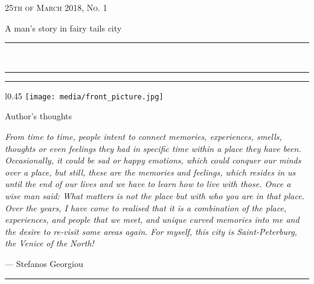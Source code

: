 \documentclass[10pt,a4paper]{article} %
\newcommand{\HorRule}[1]{\noindent\rule{\linewidth}{#1}} %
\newcommand{\SepRule}{\noindent	%
\begin{center}
\rule{250pt}{1pt} %
\end{center}
}
\newcommand{\NewsletterName}[1]{ %
\begin{center}
\Huge \usefont{T1}{fvs}{b}{n} %
#1
\end{center}	
\par \normalsize \normalfont}
\newcommand{\JournalIssue}[1]{ %
\hfill \textsc{25th of March 2018, No. #1} %
\par \normalsize \normalfont}
\newcommand{\NewsItem}[1]{ %
\usefont{T1}{fvs}{n}{n} %
\vspace{24pt}\large #1\vspace{3pt} %
\par \normalsize \normalfont}
\begin{document}
\JournalIssue{1} %

\NewsletterName{A man's story in fairy tails city} %

\noindent\HorRule{3pt} \\[-0.75\baselineskip] %
\HorRule{1pt} %


\vspace{0.5cm}
\SepRule
\vspace{-0.5cm}

\begin{center}
\begin{minipage}[h]{0.75 \linewidth}
\begin{wrapfigure}{l}{0.45 \textwidth}
\texttt{[image: media/front\_picture.jpg]}
\\
\end{wrapfigure}

\NewsItem{Author's thoughts} %
\vspace{3pt} %
\textit{
From time to time, people intent to connect memories, experiences, smells,
thoughts or even feelings they had in specific time within a place they have been.
Occasionally, it could be sad or happy emotions,
which could conquer our minds over a place,
but still, these are the memories and feelings,
which resides in us until the end of our lives
and we have to learn how to live with those.
Once a wise man said:
What matters is not the place but with who you are in that place.
Over the years, I have come to realised that it is a combination of the place,
experiences, and people that we meet, and unique curved memories into me
and the desire to re-visit some areas again.
For myself, this city is Saint-Peterburg, the Venice of the North!
}
\par\hfill --- Stefanos Georgiou
\end{minipage}
\end{center}

\vspace{0.5cm}
\SepRule %
\vspace{0.5cm}
\end{document}
